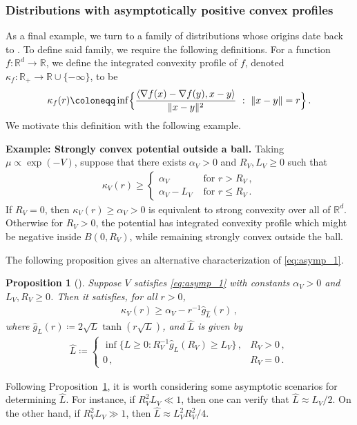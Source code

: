 \documentclass[12pt]{article}
\newcommand{\RR}{\mathbb{R}}
\newcommand{\R}{\RR}
\newcommand{\1}{\mathds{1}}
\newcommand*{\defeq}{\coloneqq}
\newcommand{\deq}{\coloneqq}
\def\defeq{\coloneqq} %
\theoremstyle{plain}
\newtheorem{proposition}[theorem]{Proposition}
\theoremstyle{definition}
\theoremstyle{remark}
\begin{document}
\subsubsection{Distributions with asymptotically positive convex profiles}\label{sec:asymp_convex}
As a final example, we turn to a family of distributions  {whose origins date back to \cite{eberle2016reflection,lindvall1986coupling}}. To define said family, we require the following definitions. For a function $f:\R^d \to \R$, we define the integrated convexity profile of $f$, denoted $\kappa_f :\R_+ \to \R\cup\{-\infty\}$, to be 
\begin{align*}
    \kappa_f(r) \defeq \inf\Bigl\{ \frac{\langle \nabla {f}(x) - \nabla {f}(y), x-y \rangle}{\|x-y\|^2} \ : \ \|x-y\| = r\Bigr\}\,.
\end{align*}
We {motivate} this definition with the following example.

\textbf{Example: Strongly convex potential outside a ball.}
Taking $\mu\propto\exp(-V)$, suppose that there exists $\alpha_V > 0 $ and $R_V,L_V \geq 0$ such that
\begin{align}\label{eq:asymp_1}
    \kappa_V(r) \geq 
    \begin{cases}
    \alpha_V & {\text{ for } } r > R_V\,, \\
    \alpha_V - L_V & {\text{ for }  }r \leq R_V\,.
    \end{cases}
\end{align}
If $R_V = 0$, then $\kappa_V(r) \geq \alpha_V > 0$ is equivalent to strong convexity over all of $\R^d$. Otherwise for $R_V > 0$, the potential has integrated convexity profile which might be negative inside $B(0,R_V)$, while remaining strongly convex outside the ball.

\medskip{}

The following proposition gives an alternative characterization of \eqref{eq:asymp_1}. 
\begin{proposition}[{\citep[Proposition 5.1]{conforti2024weak}}]\label{prop:conforti_prop}
Suppose $V$ satisfies \eqref{eq:asymp_1} with constants $\alpha_V > 0$ and $L_V, R_V \geq 0$. Then it satisfies, for all $r > 0$,
\begin{align*}
    \kappa_V(r) \geq \alpha_V - r^{-1}\hat g_{\hat L}(r)\,, 
\end{align*}
where $\hat g_L(r) \deq 2\sqrt{L}\tanh(r\sqrt{L})$, and $\hat L$ is given by
\begin{align*}
    \hat L \defeq \begin{cases}
        \inf\{ L\ge 0 : R_V^{-1}\hat g_L(R_V) \geq L_V\}\,, & R_V > 0\,, \\
        0\,, & R_V = 0\,.
    \end{cases}
\end{align*}
\end{proposition}
Following Proposition~\ref{prop:conforti_prop}, it is worth considering some asymptotic scenarios for determining $\hat L$. For instance, if $R_V^2L_V \ll 1$, then one can verify that $\hat L \approx L_V/2$. On the other hand, if $R_V^2L_V \gg 1$, then $\hat{L} \approx L_V^2R_V^2/4$. 
\end{document}
